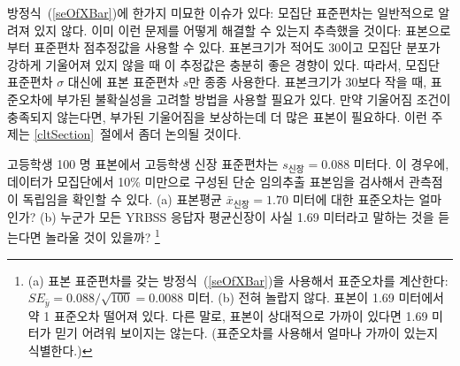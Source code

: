 방정식~(\ref{seOfXBar})에 한가지 미묘한 이슈가 있다: 모집단 표준편차는 일반적으로 알려져 있지 않다. 이미 이런 문제를 어떻게 해결할 수 있는지 추측했을 것이다: 표본으로부터 표준편차 점추정값을 사용할 수 있다. 표본크기가 적어도 30이고 모집단 분포가 강하게 기울어져 있지 않을 때 이 추정값은 충분히 좋은 경향이 있다. 따라서, 모집단 표준편차 $\sigma$ 대신에 표본 표준편차 $s$만 종종 사용한다.
표본크기가 30보다 작을 때, 표준오차에 부가된 불확실성을 고려할 방법을 사용할 필요가 있다. 만약 기울어짐 조건이 충족되지 않는다면, 부가된 
기울어짐을 보상하는데 더 많은 표본이 필요하다. 이런 주제는 \ref{cltSection}~절에서 좀더 논의될 것이다.

\begin{exercise}
고등학생 100 명 표본에서 고등학생 신장 표준편차는 $s_{신장} = 0.088$ 미터다. 이 경우에, 데이터가 모집단에서 10\% 미만으로 구성된 단순 임의추출 표본임을 검사해서 관측점이 독립임을 확인할 수 있다. (a) 표본평균 $\bar{x}_{신장} = 1.70$ 미터에 대한 표준오차는 얼마인가? (b) 누군가 모든 YRBSS 응답자 평균신장이 사실 1.69 미터라고 말하는 것을 듣는다면 놀라울 것이 있을까?
\footnote{
(a) 표본 표준편차를 갖는 방정식~(\ref{seOfXBar})을 사용해서 표준오차를 계산한다: $SE_{\bar{y}} = 0.088 / \sqrt{100} = 0.0088$ 미터. (b) 전혀 놀랍지 않다. 표본이 1.69 미터에서 약 1 표준오차 떨어져 있다. 다른 말로, 표본이 상대적으로 가까이 있다면 1.69 미터가 믿기 어려워 보이지는 않는다. (표준오차를 사용해서 얼마나 가까이 있는지 식별한다.)
}
\end{exercise}

\textC{\pagebreak}

